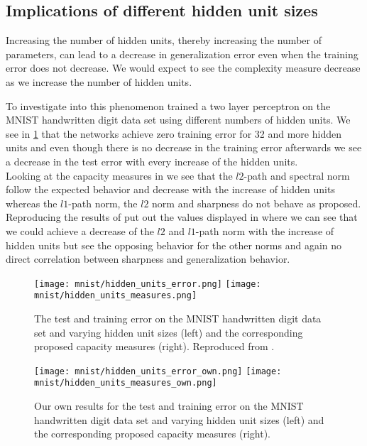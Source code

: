\subsection{Implications of different hidden unit sizes}
Increasing the number of hidden units, thereby increasing the number of parameters, can lead to a decrease in generalization error even when the training error does not decrease. We would expect to see the complexity measure decrease as we increase the number of
hidden units. \cite{neyshabur2017exploring} \par
%
To investigate into this phenomenon \ns{} trained a two layer perceptron  on the MNIST handwritten digit data set  using different numbers of hidden units. We see in \ref{fig:hidden-units-paper} that the networks achieve zero training error for 32 and more hidden units and even though there is no decrease in the training error afterwards we see a decrease in the test error with every increase of the hidden units.\\
%
Looking at the capacity measures in  we see that the $l2$-path and spectral norm follow the expected behavior and decrease with the increase of hidden units whereas the $l1$-path norm, the $l2$ norm and sharpness do not behave as proposed.
%
Reproducing the results of \cite{neyshabur2017exploring} put out the values displayed in  where we can see that we could achieve a decrease of the $l2$ and $l1$-path norm with the increase of hidden units but see the opposing behavior for the other norms and again no direct correlation between sharpness and generalization behavior.
%
\begin{figure}
	\centering
	\texttt{[image: mnist/hidden\_units\_error.png]}
	\texttt{[image: mnist/hidden\_units\_measures.png]}
	\caption{The test and training error on the MNIST handwritten digit data set and varying hidden unit sizes (left) and the corresponding proposed capacity measures (right). Reproduced from \cite{neyshabur2017exploring}.}	
	\label{fig:hidden-units-paper}
\end{figure}
\begin{figure}
	\centering
	\texttt{[image: mnist/hidden\_units\_error\_own.png]}
	\texttt{[image: mnist/hidden\_units\_measures\_own.png]}
	\caption{Our own results for the test and training error on the MNIST handwritten digit data set and varying hidden unit sizes (left) and the corresponding proposed capacity measures (right).}	
	\label{fig:hidden-units-own}
\end{figure}













